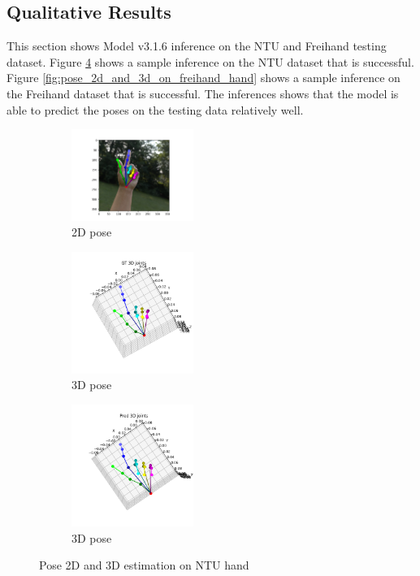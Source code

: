 \newpage
\subsection{Qualitative Results}
\noindent
This section shows Model v3.1.6 inference on the NTU and Freihand testing dataset. Figure \ref{fig:pose_2d_and_3d_on_ntu_hand} shows a sample inference on the NTU dataset that is successful. Figure \ref{fig:pose_2d_and_3d_on_freihand_hand} shows a sample inference on the Freihand dataset that is successful. The inferences shows that the model is able to predict the poses on the testing data relatively well.

\begin{figure}[ht]
    \begin{center}
        \begin{subfigure}[b]{0.32\textwidth}
            \includegraphics[width=150px]{assets/ntu_2d.png}
            \caption{2D pose}
            \label{fig:ntu_hand_2d}
        \end{subfigure}
        \begin{subfigure}[b]{0.32\textwidth}
            \includegraphics[width=150px]{assets/ntu_3d_gt.png}
            \caption{3D pose}
            \label{fig:ntu_hand_3d_gt}
        \end{subfigure}
        \begin{subfigure}[b]{0.32\textwidth}
            \includegraphics[width=150px]{assets/ntu_3d_pred.png}
            \caption{3D pose}
            \label{fig:ntu_hand_3d_pred}
        \end{subfigure}
	    \caption{Pose 2D and 3D estimation on NTU hand}
	    \label{fig:pose_2d_and_3d_on_ntu_hand}        
    \end{center}
\end{figure}

